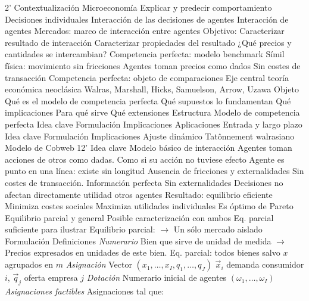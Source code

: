 \documentclass{nuevotema}
\begin{document}
\begin{esquemal}
	\1[]  2'
		\2 Contextualización
			\3 Microeconomía
				\4 Explicar y predecir comportamiento
				\4 Decisiones individuales
				\4 Interacción de las decisiones de agentes
			\3 Interacción de agentes
				\4 Mercados: marco de interacción entre agentes
				\4 Objetivo:
				\4[] Caracterizar resultado de interacción
				\4[] Caracterizar propiedades del resultado
				\4 ¿Qué precios y cantidades se intercambian?
			\3 Competencia perfecta: modelo benchmark
				\4 Símil física: movimiento sin fricciones
				\4 Agentes toman precios como dados
				\4 Sin costes de transacción
				\4 Competencia perfecta: objeto de comparaciones
				\4 Eje central teoría económica neoclásica
				\4 Walras, Marshall, Hicks, Samuelson, Arrow, Uzawa
		\2 Objeto
			\3 Qué es el modelo de competencia perfecta
			\3 Qué supuestos lo fundamentan
			\3 Qué implicaciones
			\3 Para qué sirve
			\3 Qué extensiones
		\2 Estructura
			\3 Modelo de competencia perfecta
				\4 Idea clave
				\4 Formulación
				\4 Implicaciones
				\4 Aplicaciones
			\3 Entrada y largo plazo
				\4 Idea clave
				\4 Formulación
				\4 Implicaciones
			\3 Ajuste dinámico
				\4 Tatônnement walrasiano
				\4 Modelo de Cobweb
	\1  12'
		\2 Idea clave
			\3 Modelo básico de interacción
				\4 Agentes toman acciones de otros como dadas.
				\4[$\to$] Como si su acción no tuviese efecto
				\4[$\to$] Agente es punto en una línea: existe sin longitud
			\3 Ausencia de fricciones y externalidades
				\4 Sin costes de transacción.
				\4 Información perfecta
				\4 Sin externalidades
				\4[$\to$] Decisiones no afectan directamente utilidad otros agentes
			\3 Resultado: equilibrio eficiente
				\4 Minimiza costes sociales
				\4 Maximiza utilidades individuales
				\4 Es óptimo de Pareto
			\3 Equilibrio parcial y general
				\4 Posible caracterización con ambos
				\4[$\to$] Eq. parcial suficiente para ilustrar
				\4 Equilibrio parcial:
				\4[] $\to$ Un sólo mercado aislado
		\2 Formulación
			\3 Definiciones
				\4 \textit{Numerario}
				\4[] Bien que sirve de unidad de medida
				\4[] $\to$ Precios expresados en unidades de este bien.
				\4[] Eq. parcial: todos bienes salvo $x$ agrupados en $m$
				\4 \textit{Asignación}
				\4[] Vector $(x_1, \ldots ,x_I, q_1, \ldots, q_J)$
				\4[] $\vec{x}_i$ demanda consumidor $i$, $\vec{q}_j$ oferta empresa $j$
				\4 \textit{Dotación}
				\4[] Numerario inicial de agentes $(\omega_1, \ldots, \omega_I)$
				\4 \textit{Asignaciones factibles}
				\4[] Asignaciones tal que:

\end{esquemal}
\end{document}
